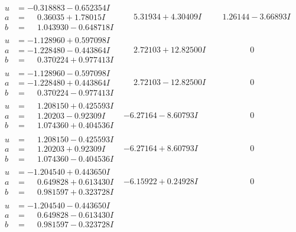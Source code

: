 \documentclass[1p]{elsarticle_modified}
\theoremstyle{definition}
\begin{document}
$$\begin{array}{c|c|c}
\begin{aligned}
u &= -0.318883 - 0.652354 I \\
a &= \phantom{-}0.36035 + 1.78015 I \\
b &= \phantom{-}1.043930 - 0.648718 I\end{aligned}
 & \phantom{-}5.31934 + 4.30409 I & \phantom{-}1.26144 - 3.66893 I \\ \hline\begin{aligned}
u &= -1.128960 + 0.597098 I \\
a &= -1.228480 - 0.443864 I \\
b &= \phantom{-}0.370224 + 0.977413 I\end{aligned}
 & \phantom{-}2.72103 + 12.82500 I & \phantom{-0.000000 } 0 \\ \hline\begin{aligned}
u &= -1.128960 - 0.597098 I \\
a &= -1.228480 + 0.443864 I \\
b &= \phantom{-}0.370224 - 0.977413 I\end{aligned}
 & \phantom{-}2.72103 - 12.82500 I & \phantom{-0.000000 } 0 \\ \hline\begin{aligned}
u &= \phantom{-}1.208150 + 0.425593 I \\
a &= \phantom{-}1.20203 - 0.92309 I \\
b &= \phantom{-}1.074360 + 0.404536 I\end{aligned}
 & -6.27164 - 8.60793 I & \phantom{-0.000000 } 0 \\ \hline\begin{aligned}
u &= \phantom{-}1.208150 - 0.425593 I \\
a &= \phantom{-}1.20203 + 0.92309 I \\
b &= \phantom{-}1.074360 - 0.404536 I\end{aligned}
 & -6.27164 + 8.60793 I & \phantom{-0.000000 } 0 \\ \hline\begin{aligned}
u &= -1.204540 + 0.443650 I \\
a &= \phantom{-}0.649828 + 0.613430 I \\
b &= \phantom{-}0.981597 + 0.323728 I\end{aligned}
 & -6.15922 + 0.24928 I & \phantom{-0.000000 } 0 \\ \hline\begin{aligned}
u &= -1.204540 - 0.443650 I \\
a &= \phantom{-}0.649828 - 0.613430 I \\
b &= \phantom{-}0.981597 - 0.323728 I\end{aligned}

\end{array}$$
\end{document}
